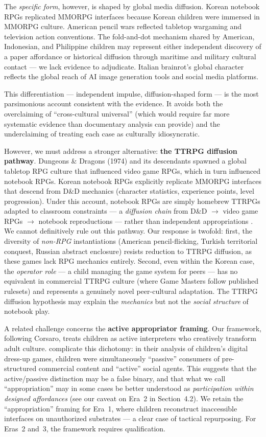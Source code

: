 \documentclass[12pt]{article}
\begin{document}
The \emph{specific form}, however, is shaped by global media diffusion. Korean notebook RPGs replicated MMORPG interfaces because Korean children were immersed in MMORPG culture. American pencil wars reflected tabletop wargaming and television action conventions. The fold-and-dot mechanism shared by American, Indonesian, and Philippine children may represent either independent discovery of a paper affordance or historical diffusion through maritime and military cultural contact --- we lack evidence to adjudicate. Italian brainrot's global character reflects the global reach of AI image generation tools and social media platforms.

This differentiation --- independent impulse, diffusion-shaped form --- is the most parsimonious account consistent with the evidence. It avoids both the overclaiming of ``cross-cultural universal'' (which would require far more systematic evidence than documentary analysis can provide) and the underclaiming of treating each case as culturally idiosyncratic.

However, we must address a stronger alternative: \textbf{the TTRPG diffusion pathway}. Dungeons \& Dragons (1974) and its descendants spawned a global tabletop RPG culture that influenced video game RPGs, which in turn influenced notebook RPGs. Korean notebook RPGs explicitly replicate MMORPG interfaces that descend from D\&D mechanics (character statistics, experience points, level progression). Under this account, notebook RPGs are simply homebrew TTRPGs adapted to classroom constraints --- a \emph{diffusion chain} from D\&D $\to$ video game RPGs $\to$ notebook reproductions --- rather than independent appropriations \citep{fine1983}. We cannot definitively rule out this pathway. Our response is twofold: first, the diversity of \emph{non-RPG} instantiations (American pencil-flicking, Turkish territorial conquest, Russian abstract enclosure) resists reduction to TTRPG diffusion, as these games lack RPG mechanics entirely. Second, even within the Korean case, the \emph{operator role} --- a child managing the game system for peers --- has no equivalent in commercial TTRPG culture (where Game Masters follow published rulesets) and represents a genuinely novel peer-cultural adaptation. The TTRPG diffusion hypothesis may explain the \emph{mechanics} but not the \emph{social structure} of notebook play.

A related challenge concerns the \textbf{active appropriator framing}. Our framework, following Corsaro, treats children as active interpreters who creatively transform adult culture. \citet{mustola2018} complicate this dichotomy: in their analysis of children's digital dress-up games, children were simultaneously ``passive'' consumers of pre-structured commercial content and ``active'' social agents. This suggests that the active/passive distinction may be a false binary, and that what we call ``appropriation'' may in some cases be better understood as \emph{participation within designed affordances} (see our caveat on Era~2 in Section~4.2). We retain the ``appropriation'' framing for Era~1, where children reconstruct inaccessible interfaces on unauthorized substrates --- a clear case of tactical repurposing. For Eras~2 and~3, the framework requires qualification.
\end{document}
